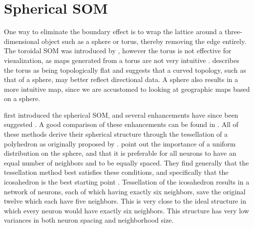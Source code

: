 \section{Spherical SOM}
One way to eliminate the boundary effect is to wrap the lattice around a
three-dimensional object such as a sphere or torus, thereby removing the edge
entirely. The toroidal SOM was introduced by \cite{li1993}, however the torus is
not effective for visualization, as maps generated from a torus are not
very intuitive \citep{ito2000,wu2006}.  \cite{ritter99} describes the torus as
being topologically flat and suggests that a curved topology, such as that of a
sphere, may better reflect directional data.  A sphere also results in a more
intuitive map, since we are accustomed to looking at geographic maps based on a sphere.

\cite{ritter99} first introduced the spherical SOM, and several enhancements have
since been suggested \citep{boudjemai2003,sangole03,Nishio:2006fk,wu2006}.  A
good comparison of these enhancements can be found in \cite{wu2006}.  All of
these methods derive their spherical structure through the tessellation of a
polyhedron as originally proposed by \cite{ritter99}.  \cite{wu2006} point
out the importance of a uniform distribution on the sphere, and that it is
preferable for all neurons to have an equal number of neighbors and to be
equally spaced.  They find generally that the tessellation method best satisfies
these conditions, and specifically that the icosahedron is the best starting
point \citep{wu2005}. Tessellation of the icosahedron results in a network of
neurons, each of which having exactly six neighbors, save the original twelve
which each have five neighbors.  This is very close to the ideal structure in which every
neuron would have exactly six neighbors.  This structure has very low variances
in both neuron spacing and neighborhood size.


